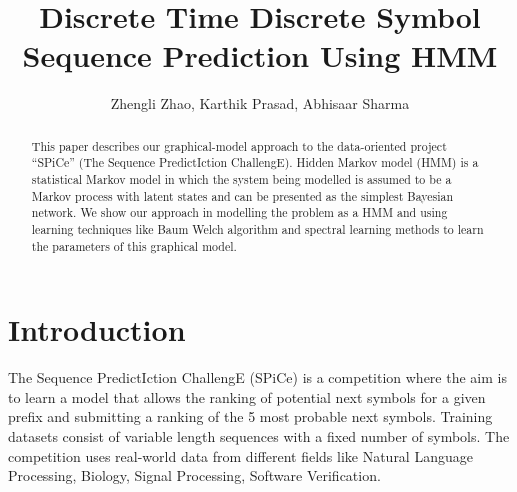 

\title{Discrete Time Discrete Symbol Sequence Prediction Using HMM}

\author{Zhengli Zhao, Karthik Prasad, Abhisaar Sharma} %

%



\maketitle

\begin{abstract}
This paper describes our graphical-model approach to the data-oriented project “SPiCe” (The Sequence PredictIction ChallengE). Hidden Markov model (HMM) is a statistical Markov model in which the system being modelled is assumed to be a Markov process with latent states and can be presented as the simplest Bayesian network. We show our approach in modelling the problem as a HMM and using learning techniques like Baum Welch algorithm and spectral learning methods to learn the parameters of this graphical model.

\end{abstract}

\section{Introduction}
The Sequence PredictIction ChallengE (SPiCe) is a competition where the aim is to learn a model that allows the ranking of potential next symbols for a given prefix and submitting a ranking of the 5 most probable next symbols. Training datasets consist of variable length sequences with a fixed number of symbols. The competition uses real-world data from different fields like Natural Language Processing, Biology, Signal Processing, Software Verification.

